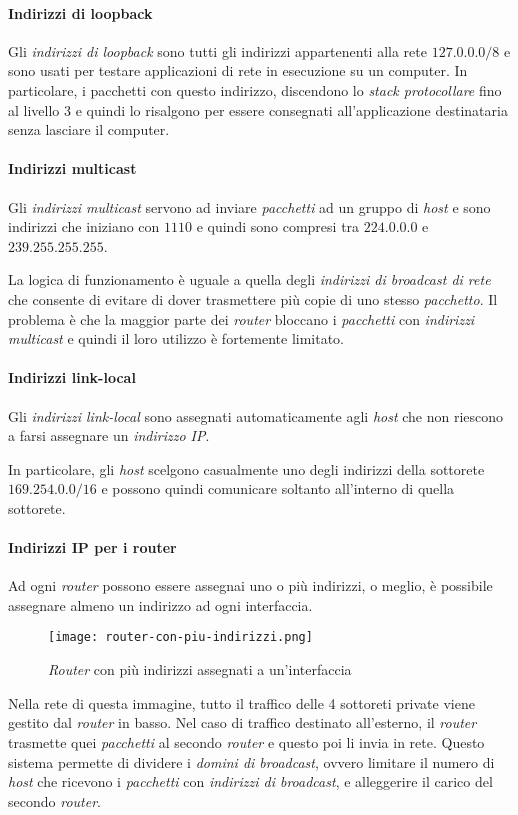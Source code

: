 \paragraph{Indirizzi di loopback}
Gli \emph{indirizzi di loopback} sono tutti gli indirizzi appartenenti alla rete
$127.0.0.0/8$ e sono usati per testare applicazioni di rete in esecuzione su un
computer. In particolare, i pacchetti con questo indirizzo, discendono lo
\emph{stack protocollare} fino al livello 3 e quindi lo risalgono per essere
consegnati all'applicazione destinataria senza lasciare il computer.

\paragraph{Indirizzi multicast}
Gli \emph{indirizzi multicast} servono ad inviare \emph{pacchetti} ad un gruppo
di \emph{host} e sono indirizzi che iniziano con $1110$ e quindi sono compresi
tra $224.0.0.0$ e $239.255.255.255$.

La logica di funzionamento è uguale a quella degli \emph{indirizzi di broadcast
di rete} che consente di evitare di dover trasmettere più copie di uno stesso
\emph{pacchetto}. Il problema è che la maggior parte dei \emph{router} bloccano
i \emph{pacchetti} con \emph{indirizzi multicast} e quindi il loro utilizzo è
fortemente limitato.

\paragraph{Indirizzi link-local}
Gli \emph{indirizzi link-local} sono assegnati automaticamente agli \emph{host}
che non riescono a farsi assegnare un \emph{indirizzo IP}\footnotemark.

In particolare, gli \emph{host} scelgono casualmente uno degli indirizzi della
sottorete $169.254.0.0/16$ e possono quindi comunicare soltanto all'interno di
quella sottorete.


\paragraph{Indirizzi IP per i router}
Ad ogni \emph{router} possono essere assegnai uno o più indirizzi, o meglio,
è possibile assegnare almeno un indirizzo ad ogni interfaccia.

\begin{figure}[h!]
    \centering
    \texttt{[image: router-con-piu-indirizzi.png]}
    \caption{\emph{Router} con più indirizzi assegnati a un'interfaccia}
\end{figure}\noindent
Nella rete di questa immagine, tutto il traffico delle 4 sottoreti private viene
gestito dal \emph{router} in basso. Nel caso di traffico destinato all'esterno,
il \emph{router} trasmette quei \emph{pacchetti} al secondo \emph{router} e
questo poi li invia in rete. Questo sistema permette di dividere i \emph{domini
di broadcast}\footnotemark, ovvero limitare il numero di \emph{host} che ricevono
i \emph{pacchetti} con \emph{indirizzi di broadcast}, e alleggerire il carico
del secondo \emph{router}.

